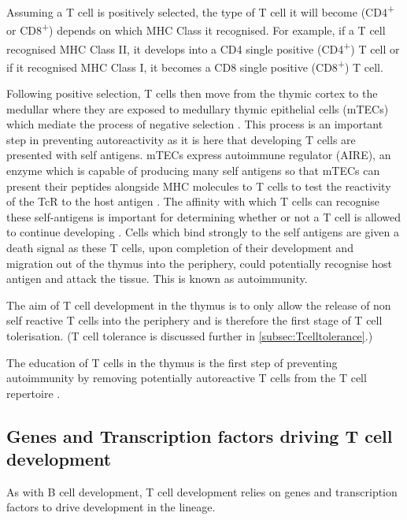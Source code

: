 Assuming a T cell is positively selected, the type of T cell it will become (CD4\textsuperscript{+} or CD8\textsuperscript{+}) depends on which MHC Class it recognised.
For example, if a T cell recognised MHC Class II, it develops into a CD4 single positive (CD4\textsuperscript{+}) T cell or if it recognised MHC Class I, it becomes a CD8 single positive (CD8\textsuperscript{+}) T cell.

Following positive selection, T cells then move from the thymic cortex to the medullar where they are exposed to medullary thymic epithelial cells (mTECs) which mediate the process of negative selection \citep{Starr2003}.
This process is an important step in preventing autoreactivity as it is here that developing T cells are presented with self antigens.
mTECs express autoimmune regulator (AIRE), an enzyme which is capable of producing many self antigens so that mTECs can present their peptides alongside MHC molecules to T cells to test the reactivity of the TcR to the host antigen \citep{Anderson2011}.
The affinity with which T cells can recognise these self-antigens is important for determining whether or not a T cell is allowed to continue developing \citep{Ashton1994}.
Cells which bind strongly to the self antigens are given a death signal as these T cells, upon completion of their development and migration out of the thymus into the periphery, could potentially recognise host antigen and attack the tissue.
This is known as autoimmunity.

The aim of T cell development in the thymus is to only allow the release of non self reactive T cells into the periphery and is therefore the first stage of T cell tolerisation. 
(T cell tolerance is discussed further in \cref{subsec:Tcelltolerance}.)

The education of T cells in the thymus is the first step of preventing autoimmunity by removing potentially autoreactive T cells from the T cell repertoire \citep{Walker2002}.

\subsection{Genes and Transcription factors driving T cell development}
\label{subsec:Tcellgenes}

As with B cell development, T cell development relies on genes and transcription factors to drive development in the lineage.

